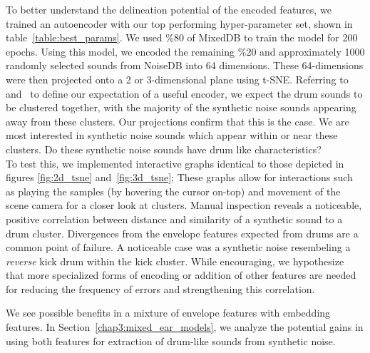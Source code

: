 \documentclass[\main/thesis.tex]{subfiles}
\begin{document}
To better understand the delineation potential of the encoded features,  we trained an autoencoder with our top performing hyper-parameter set, shown in table~\ref{table:best_params}. We used \%80 of MixedDB to train the model for 200 epochs. Using this model, we encoded the remaining \%20 and approximately 1000 randomly selected sounds from NoiseDB into 64 dimensions. These 64-dimensions were then projected onto a 2 or 3-dimensional plane using t-SNE. Referring to~ and~ to define our expectation of a useful encoder, we expect the drum sounds to be clustered together, with the majority of the synthetic noise sounds appearing away from these clusters. Our projections confirm that this is the case. We are most interested in synthetic noise sounds which appear within or near these clusters. Do these synthetic noise sounds have drum like characteristics?\\ 

To test this, we implemented interactive graphs identical to those depicted in figures \ref{fig:2d_tsne} and~\ref{fig:3d_tsne}; These graphs allow for interactions such as playing the samples (by hovering the cursor on-top) and movement of the scene camera for a closer look at clusters.  Manual inspection reveals a noticeable, positive correlation between distance and similarity of a synthetic sound to a drum cluster. Divergences from the envelope features expected from drums are a common point of failure. A noticeable case was a synthetic noise resembeling a \emph{reverse} kick drum within the kick cluster. While encouraging, we hypothesize that more specialized forms of encoding or addition of other features are needed for reducing the frequency of errors and strengthening this correlation.

We see possible benefits in a mixture of envelope features with embedding features. In Section~\ref{chap3:mixed_ear_models}, we analyze the potential gains in using both features for extraction of drum-like sounds from synthetic noise. 
\end{document}
